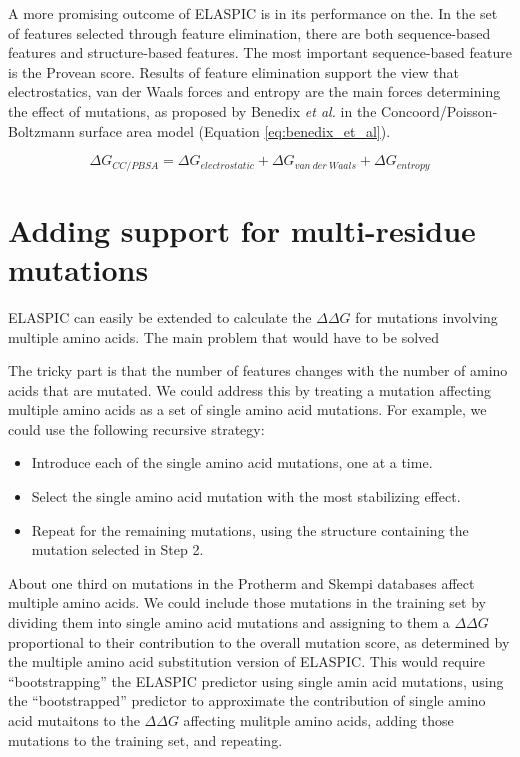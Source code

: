 A more promising outcome of ELASPIC is in its performance on the. In the set of features selected through feature elimination, there are both sequence-based features and structure-based features. The most important sequence-based feature is the Provean score. Results of feature elimination support the view that electrostatics, van der Waals forces and entropy are the main forces determining the effect of mutations, as proposed by Benedix \textit{et al.} in the Concoord/Poisson-Boltzmann surface area model (Equation \ref{eq:benedix_et_al}).

\begin{equation} \label{eq:benedix_et_al}
    \Delta G_{CC/PBSA} = \Delta G_{electrostatic} + \Delta G_{van\ der\ Waals} + \Delta G_{entropy}
\end{equation}



\section{Adding support for multi-residue mutations} \label{sec:more_data}

ELASPIC can easily be extended to calculate the $\Delta \Delta G$ for mutations involving multiple amino acids. The main problem that would have to be solved

The tricky part is that the number of features changes with the number of amino acids that are mutated. We could address this by treating a mutation affecting multiple amino acids as a set of single amino acid mutations. For example, we could use the following recursive strategy:

\begin{itemize}
	\itemsep0em
    \item Introduce each of the single amino acid mutations, one at a time.
    \item Select the single amino acid mutation with the most stabilizing effect.
    \item Repeat for the remaining mutations, using the structure containing the mutation selected in Step 2.
\end{itemize}

About one third on mutations in the Protherm and Skempi databases affect multiple amino acids. We could include those mutations in the training set by dividing them into single amino acid mutations and assigning to them a $\Delta \Delta G$ proportional to their contribution to the overall mutation score, as determined by the multiple amino acid substitution version of ELASPIC. This would require ``bootstrapping'' the ELASPIC predictor using single amin acid mutations, using the ``bootstrapped'' predictor to approximate the contribution of single amino acid mutaitons to the $\Delta \Delta G$ affecting mulitple amino acids, adding those mutations to the training set, and repeating.

